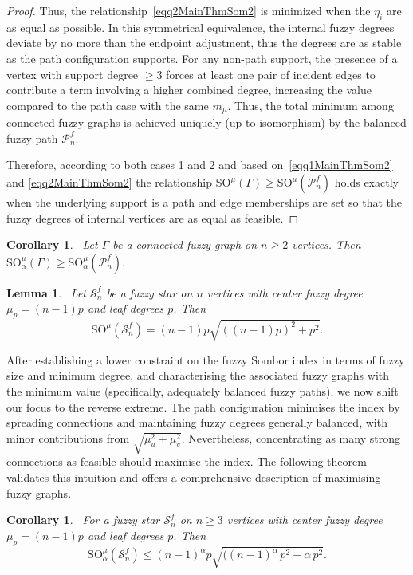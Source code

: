 \documentclass[12pt]{amsart}
\newtheorem{lemma}[theorem]{Lemma}
\newtheorem{corollary}[theorem]{Corollary}
\newcommand{\SOG}{\mathrm{SO}^{\mu}}
\newcommand{\PP}{\mathcal{P}}
\newcommand{\SN}{\mathcal{S}}
\begin{document}
\begin{proof}
Thus, the relationship~\eqref{eqq2MainThmSom2} is minimized when the $\eta_i$ are as equal as possible. 
In this symmetrical equivalence, the internal fuzzy degrees deviate by no more than the endpoint adjustment, thus the degrees are as stable as the path configuration supports.
For any non-path support, the presence of a vertex with support degree $\geq 3$ forces at least one pair of incident edges to contribute a term involving a higher combined degree, increasing the value compared to the path case with the same $m_{\mu}$. Thus, the total minimum among connected fuzzy graphs is achieved uniquely (up to isomorphism) by the balanced fuzzy path $\PP_n^f$.

Therefore, according to both cases 1 and 2 and based on~\eqref{eqq1MainThmSom2} and \eqref{eqq2MainThmSom2} the relationship $\SOG(\Gamma) \geqslant \SOG(\PP_n^f)$ holds exactly when the underlying support is a path and edge memberships are set so that the fuzzy degrees of internal vertices are as equal as feasible.
\end{proof}

\begin{corollary}~\label{corfuzzy001}
Let $\Gamma$ be a connected fuzzy graph on $n \geqslant 2$ vertices. Then $\SOG_{\alpha}(\Gamma) \geqslant \SOG_{\alpha}(\PP_n^f).$
\end{corollary}

\begin{lemma}~\label{lemstar01}
Let $\SN_n^f$ be a fuzzy star on $n$ vertices with center fuzzy degree $\mu_p=(n-1)p$ and leaf degrees $p$. Then
\[
\SOG(\SN_n^f)=(n-1) p \sqrt{ ((n-1)p)^2+p^2}.
\]
\end{lemma}

After establishing a lower constraint on the fuzzy Sombor index in terms of fuzzy size and minimum degree, and characterising the associated fuzzy graphs with the minimum value (specifically, adequately balanced fuzzy paths), we now shift our focus to the reverse extreme. The path configuration minimises the index by spreading connections and maintaining fuzzy degrees generally balanced, with minor contributions from $\sqrt{\mu_u^2 + \mu_v^2}$. Nevertheless, concentrating as many strong connections as feasible should maximise the index. The following theorem validates this intuition and offers a comprehensive description of maximising fuzzy graphs.
\begin{corollary}~\label{corfuzzy002}
For   a fuzzy star $\SN_n^f$ on $n\geqslant 3$ vertices with center fuzzy degree $\mu_p=(n-1)p$ and leaf degrees $p$. Then
\[
\SOG_{\alpha}(\SN_n^f)\leqslant(n-1)^{\alpha} p \sqrt{ ((n-1)^{\alpha}\,p^2+\alpha\,p^2}.
\]
\end{corollary}
\end{document}

